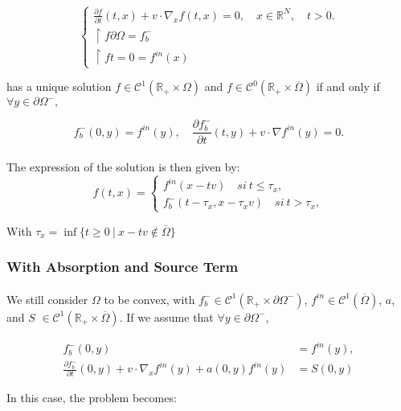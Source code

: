 \documentclass[onecolumn, 12pt, a4paper]{article}
\begin{document}
\[
\begin{cases}
\frac{\partial f}{\partial t}(t,x)+v \cdot \nabla_x f(t,x)=0, \quad x \in \mathbb{R}^N, \quad t>0.\\
\restriction{f}{\partial \Omega}= f_b^-\\
\restriction{f}{t=0}= f^{in}(x)
\end{cases}
\]

has a unique solution $f \in \mathcal{C}^1(\mathbb{R}_+ \times \Omega)$ and $f \in \mathcal{C}^0(\mathbb{R}_+ \times \overline{\Omega})$ if and only if $\forall y \in \partial \Omega^-,$

\[ f_b^-(0,y) = f^{in}(y), \quad \frac{\partial f_b^-}{\partial t}(t,y)+v \cdot \nabla f^{in}(y)=0. \]

\paragraph{}

The expression of the solution is then given by: 
\[
\boxed{
f(t,x)= 
\begin{cases}
f^{in}(x-tv) \quad si~ t \leq \tau_x ,\\
f_b^-(t-\tau_x,x-\tau_xv) \quad si~ t > \tau_x ,
\end{cases}
}
\]

With $\tau_x= \inf \{t \geq 0~ | ~ x-tv \notin \overline{\Omega}\}$

\subsubsection{With Absorption and Source Term}

\paragraph{}
We still consider $\Omega$ to be convex, with $f_b^- \in \mathcal{C}^1(\mathbb{R}_+ \times \partial \Omega^-)$, $f^{in} \in \mathcal{C}^1(\overline{\Omega})$, $a$, and $S$ $\in \mathcal{C}^1(\mathbb{R}_+ \times \overline{\Omega})$. If we assume that $\forall y \in \partial \Omega^-$,

\[
\begin{aligned}
f_b^-(0,y) &= f^{in}(y), \\
\frac{\partial f_b^-}{\partial t}(0,y) + v \cdot \nabla_x f^{in}(y) + a(0,y)f^{in}(y)&=S(0,y)
\end{aligned}
\]



In this case, the problem becomes:
\end{document}
